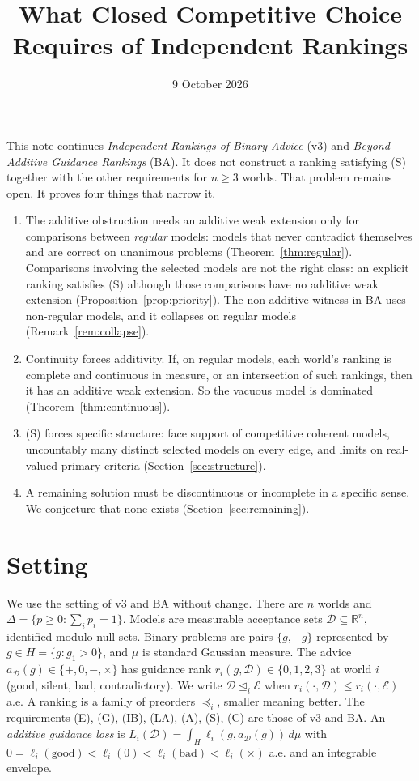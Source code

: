 \documentclass[11pt]{article}
\title{What Closed Competitive Choice Requires of Independent Rankings}
\author{}\date{9 October 2026}
\theoremstyle{remark}\newtheorem{remark}[theorem]{Remark}
\newcommand{\R}{\mathbb R}
\newcommand{\Dscr}{\mathcal D}
\newcommand{\Escr}{\mathcal E}
\begin{document}
\maketitle

\noindent
This note continues \emph{Independent Rankings of Binary Advice} (v3) and
\emph{Beyond Additive Guidance Rankings} (BA). It does not construct a ranking
satisfying (S) together with the other requirements for $n\ge3$ worlds. That
problem remains open. It proves four things that narrow it.
\begin{enumerate}[leftmargin=*,itemsep=2pt]
\item The additive obstruction needs an additive weak extension only for
comparisons between \emph{regular} models: models that never contradict
themselves and are correct on unanimous problems
(Theorem~\ref{thm:regular}). Comparisons involving the selected models are
not the right class: an explicit ranking satisfies (S) although those
comparisons have no additive weak extension (Proposition~\ref{prop:priority}).
The non-additive witness in BA uses non-regular models, and it collapses on
regular models (Remark~\ref{rem:collapse}).
\item Continuity forces additivity. If, on regular models, each world's ranking
is complete and continuous in measure, or an intersection of such rankings,
then it has an additive weak extension. So the vacuous model is dominated
(Theorem~\ref{thm:continuous}).
\item (S) forces specific structure: face support of competitive coherent
models, uncountably many distinct selected models on every edge, and limits
on real-valued primary criteria (Section~\ref{sec:structure}).
\item A remaining solution must be discontinuous or incomplete in a specific
sense. We conjecture that none exists (Section~\ref{sec:remaining}).
\end{enumerate}

\section{Setting}

We use the setting of v3 and BA without change. There are $n$ worlds and
$\Delta=\{p\ge0:\sum_ip_i=1\}$. Models are measurable acceptance sets
$\Dscr\subseteq\R^n$, identified modulo null sets. Binary problems are pairs
$\{g,-g\}$ represented by $g\in H=\{g:g_1>0\}$, and $\mu$ is standard Gaussian
measure. The advice $a_\Dscr(g)\in\{+,0,-,\times\}$ has guidance rank
$r_i(g,\Dscr)\in\{0,1,2,3\}$ at world $i$ (good, silent, bad, contradictory).
We write $\Dscr\unlhd_i\Escr$ when $r_i(\cdot,\Dscr)\le r_i(\cdot,\Escr)$ a.e.
A ranking is a family of preorders $\preceq_i$, smaller meaning better.
The requirements (E), (G), (IB), (LA), (A), (S), (C) are those of v3 and BA.
An \emph{additive guidance loss} is
$L_i(\Dscr)=\int_H\ell_i(g,a_\Dscr(g))\,d\mu$ with
$0=\ell_i(\mathrm{good})<\ell_i(0)<\ell_i(\mathrm{bad})<\ell_i(\times)$ a.e.
and an integrable envelope.
\end{document}
